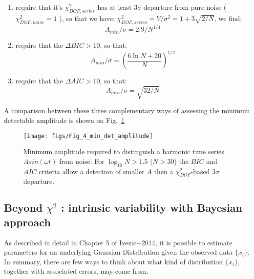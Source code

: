 \documentclass[fleqn,usenatbib]{mnras}  %
\begin{document}
\begin{enumerate}[label=\alph*)]

	\item require that it's $\chi^{2}_{DOF,series}$ has at least $3\sigma$ departure from pure noise ($\chi^{2}_{DOF,noise} = 1$ ),  so that we have:
	$\chi^{2}_{DOF,series} =  V / \sigma^{2} = 1 +3 \sqrt{2/N}$, we find:
	  \begin{equation}
	      A_{min} /\sigma = 2.9 / N^{1/4}
	  \end{equation}

	\item require that the $\Delta BIC > 10$, so that:
	  \begin{equation}
	      A_{min}/\sigma = \left( \frac{6 \ln {N} + 20 }{N} \right) ^ {1/2}
	  \end{equation}
	  
	\item require that the $\Delta AIC > 10$, so that: 
	  \begin{equation}
	      A_{min} / \sigma = \sqrt{32/N}
	  \end{equation}

\end{enumerate}


A comparison between these three complementary ways of assessing the minimum detectable amplitude is shown on Fig.~\ref{fig:chi_BIC_AIC}

\begin{figure}
 \texttt{[image: figs/Fig\_4\_min\_det\_amplitude]}
 \caption{Minimum amplitude required to distinguish a harmonic time series $A sin(\omega t)$  from noise. For $ \log_{10} N > 1.5$ ($N > 30 $) the $BIC$ and $AIC$ criteria allow a detection of smaller $A$ then a $\chi^{2}_{DOF}$-based $3\sigma$ departure.}
 \label{fig:chi_BIC_AIC}
\end{figure}



\subsection{Beyond $\chi^{2}$ : intrinsic variability with Bayesian approach}

As described in  detail in Chapter 5 of Ivezic+2014, it is possible to estimate parameters for  an underlying Gaussian Distribution given the observed data $\{x_{i}\}$. In summary, there are few ways to think about what kind of distribution $\{x_{i}\}$, together with associated errors, may come from. 
\end{document}
